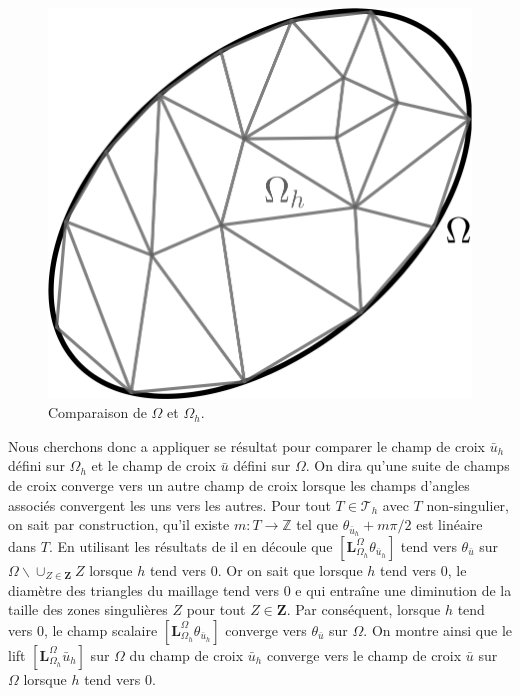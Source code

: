 \begin{figure}[!h]
  \centering
  \includegraphics[scale=0.45]{images/Omega_vs_Omega_h.pdf}
  \caption{Comparaison de $\Omega$ et $\Omega_h$.}
  \label{fig:Omega_vs_Omega_h}
\end{figure}

Nous cherchons donc a appliquer se résultat pour comparer le champ de croix $\bar{u}_h$ défini sur $\Omega_h$ et le champ de croix $\bar{u}$ défini sur $\Omega$. On dira qu'une suite de champs de croix converge vers un autre champ de croix lorsque les champs d'angles associés convergent les uns vers les autres.
Pour tout $T\in\mathcal{T}_h$ avec $T$ non-singulier, on sait par construction, qu'il existe $m:T\longrightarrow \mathbb{Z}$ tel que $\theta_{\bar{u}_h}+m\pi/2$ est linéaire dans $T$. En utilisant les résultats de \cite{dziuk1988finite} il en découle que $[\mathbf{L}_{\Omega_h}^{\Omega}\theta_{\bar{u}_h}]$ tend vers $\theta_{\bar{u}}$ sur $\Omega\backslash\cup_{Z\in\mathbf{Z}}Z$ lorsque $h$ tend vers $0$. Or on sait que lorsque $h$ tend vers $0$, le diamètre des triangles du maillage tend vers $0$ e qui entraîne une diminution de la taille des zones singulières $Z$ pour tout $Z\in\mathbf{Z}$. Par conséquent, lorsque $h$ tend vers $0$, le champ scalaire $[\mathbf{L}_{\Omega_h}^{\Omega}\theta_{\bar{u}_h}]$ converge vers $\theta_{\bar{u}}$ sur $\Omega$. On montre ainsi que le lift $[\mathbf{L}_{\Omega_h}^{\Omega}\bar{u}_h]$ sur $\Omega$ du champ de croix $\bar{u}_h$ converge vers le champ de croix $\bar{u}$ sur $\Omega$ lorsque $h$ tend vers $0$.

